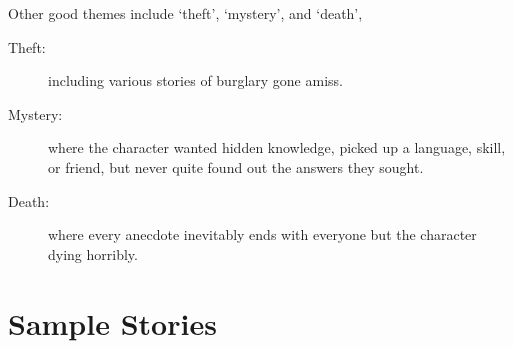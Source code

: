 \begin{multicols}{2}
Other good themes include `theft', `mystery', and `death', 

\begin{description}
  \item[Theft:]
  including various stories of burglary gone amiss.
  \item[Mystery:]
  where the character wanted hidden knowledge, picked up a language, skill, or friend, but never quite found out the answers they sought.
  \item[Death:]
  where every anecdote inevitably ends with everyone but the character dying horribly.
\end{description}

\end{multicols}

\section{Sample Stories}


